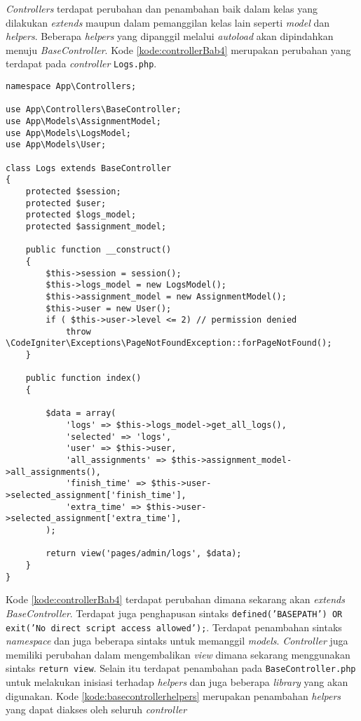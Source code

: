 \textit{Controllers} terdapat perubahan dan penambahan baik dalam kelas yang dilakukan \textit{extends} maupun dalam pemanggilan kelas lain seperti \textit{model} dan \textit{helpers}. Beberapa \textit{helpers} yang dipanggil melalui \textit{autoload} akan dipindahkan menuju \textit{BaseController}. Kode \ref{kode:controllerBab4} merupakan perubahan yang terdapat pada \textit{controller} \texttt{Logs.php}.

\begin{lstlisting}[caption=Perubahan kode \textit{controllers} pada \textit{CodeIgniter 4}, label=kode:controllerBab4]
namespace App\Controllers;

use App\Controllers\BaseController;
use App\Models\AssignmentModel;
use App\Models\LogsModel;
use App\Models\User;

class Logs extends BaseController
{
	protected $session;
	protected $user;
	protected $logs_model;
	protected $assignment_model;

	public function __construct()
	{
		$this->session = session();
		$this->logs_model = new LogsModel();
		$this->assignment_model = new AssignmentModel();
		$this->user = new User();
		if ( $this->user->level <= 2) // permission denied
			throw \CodeIgniter\Exceptions\PageNotFoundException::forPageNotFound();
	}
	
	public function index()
	{

		$data = array(
			'logs' => $this->logs_model->get_all_logs(),
			'selected' => 'logs',
			'user' => $this->user,
			'all_assignments' => $this->assignment_model->all_assignments(),
			'finish_time' => $this->user->selected_assignment['finish_time'],
			'extra_time' => $this->user->selected_assignment['extra_time'],
		);

		return view('pages/admin/logs', $data);
	}
}
\end{lstlisting}

Kode \ref{kode:controllerBab4} terdapat perubahan dimana sekarang akan \textit{extends} \textit{BaseController}. Terdapat juga penghapusan sintaks \texttt{defined('BASEPATH') OR exit('No direct script access allowed');}. Terdapat penambahan sintaks \textit{namespace} dan juga beberapa sintaks untuk memanggil \textit{models}. \textit{Controller} juga memiliki perubahan dalam mengembalikan \textit{view} dimana sekarang menggunakan sintaks \texttt{return view}. Selain itu terdapat penambahan pada \texttt{BaseController.php} untuk melakukan inisiasi terhadap \textit{helpers} dan juga beberapa \textit{library} yang akan digunakan. Kode \ref{kode:basecontrollerhelpers} merupakan penambahan \textit{helpers} yang dapat diakses oleh seluruh \textit{controller}

